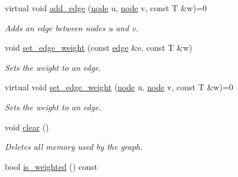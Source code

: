 \begin{DoxyCompactItemize}
virtual void \hyperlink{classlgraph_1_1wxgraph_ab3a4257d69654f2e778fc253eccd4cf1}{add\-\_\-edge} (\hyperlink{namespacelgraph_a397169dd66adf725210a30fb7251773e}{node} u, \hyperlink{namespacelgraph_a397169dd66adf725210a30fb7251773e}{node} v, const T \&w)=0
\begin{DoxyCompactList}\small\item\em Adds an edge between nodes {\itshape u} and {\itshape v}. \end{DoxyCompactList}\item 
void \hyperlink{classlgraph_1_1wxgraph_a9779e7b5d0a767d4b3c61a7c9a4c2449}{set\-\_\-edge\-\_\-weight} (const \hyperlink{namespacelgraph_a76bd7d50719f03de7a85db259d80d572}{edge} \&e, const T \&w)
\begin{DoxyCompactList}\small\item\em Sets the weight to an edge. \end{DoxyCompactList}\item 
virtual void \hyperlink{classlgraph_1_1wxgraph_a463761d3fee15f119f214bb90c63dec2}{set\-\_\-edge\-\_\-weight} (\hyperlink{namespacelgraph_a397169dd66adf725210a30fb7251773e}{node} u, \hyperlink{namespacelgraph_a397169dd66adf725210a30fb7251773e}{node} v, const T \&w)=0
\begin{DoxyCompactList}\small\item\em Sets the weight to an edge. \end{DoxyCompactList}\item 
void \hyperlink{classlgraph_1_1wxgraph_a5ce8055002673c718131a091b3f17fc0}{clear} ()
\begin{DoxyCompactList}\small\item\em Deletes all memory used by the graph. \end{DoxyCompactList}\item 
\hypertarget{classlgraph_1_1wxgraph_a12ed6499d974dafbbca857e00823ab9c}{bool \hyperlink{classlgraph_1_1wxgraph_a12ed6499d974dafbbca857e00823ab9c}{is\-\_\-weighted} () const }\label{classlgraph_1_1wxgraph_a12ed6499d974dafbbca857e00823ab9c}


\end{DoxyCompactItemize}
